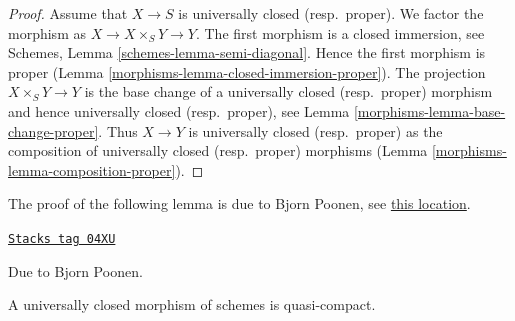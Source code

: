 \begin{proof}

Assume that $X \to S$ is universally closed (resp.\ proper).
We factor the morphism as $X \to X \times_S Y \to Y$.
The first morphism is a closed immersion, see
Schemes, Lemma \ref{schemes-lemma-semi-diagonal}.
Hence the first morphism is proper (Lemma \ref{morphisms-lemma-closed-immersion-proper}).
The projection $X \times_S Y \to Y$ is the base change
of a universally closed (resp.\ proper) morphism and hence
universally closed (resp.\ proper), see Lemma \ref{morphisms-lemma-base-change-proper}.
Thus $X \to Y$ is universally closed (resp.\ proper) as the composition
of universally closed (resp.\ proper) morphisms
(Lemma \ref{morphisms-lemma-composition-proper}).
\end{proof}

The proof of the following lemma is due to Bjorn Poonen, see
\href{https://mathoverflow.net/questions/23337/is-a-universally-closed-morphism-of-schemes-quasi-compact/23528#23528}{this location}.

\begin{lemma}
\label{morphisms-lemma-universally-closed-quasi-compact}
\href{https://stacks.math.columbia.edu/tag/04XU}{\texttt{Stacks tag 04XU}}

\begin{reference}
Due to Bjorn Poonen.
\end{reference}
A universally closed morphism of schemes is quasi-compact.
\end{lemma}

